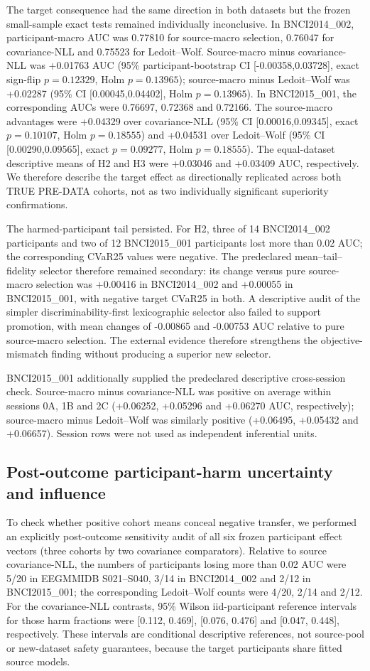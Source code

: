 The target consequence had the same direction in both datasets but the
frozen small-sample exact tests remained individually inconclusive. In
BNCI2014\_002, participant-macro AUC was 0.77810 for source-macro selection,
0.76047 for covariance-NLL and 0.75523 for Ledoit--Wolf.
Source-macro minus covariance-NLL was +0.01763 AUC
(95\% participant-bootstrap CI [-0.00358,0.03728], exact sign-flip
\(p=0.12329\), Holm \(p=0.13965\)); source-macro minus Ledoit--Wolf was
+0.02287 (95\% CI [0.00045,0.04402], Holm \(p=0.13965\)).
In BNCI2015\_001, the corresponding AUCs were 0.76697, 0.72368 and 0.72166.
The source-macro advantages were +0.04329 over covariance-NLL
(95\% CI [0.00016,0.09345], exact \(p=0.10107\), Holm
\(p=0.18555\)) and +0.04531 over Ledoit--Wolf
(95\% CI [0.00290,0.09565], exact \(p=0.09277\), Holm
\(p=0.18555\)). The equal-dataset descriptive means of H2 and H3 were
+0.03046 and +0.03409 AUC, respectively. We therefore describe the target
effect as directionally replicated across both TRUE PRE-DATA cohorts, not as
two individually significant superiority confirmations.

The harmed-participant tail persisted. For H2, three of 14 BNCI2014\_002
participants and two of 12 BNCI2015\_001 participants lost more than
0.02 AUC; the corresponding CVaR25 values were negative. The predeclared
mean--tail--fidelity selector therefore remained secondary: its change versus
pure source-macro selection was +0.00416 in BNCI2014\_002 and +0.00055 in
BNCI2015\_001, with negative target CVaR25 in both. A descriptive audit of
the simpler discriminability-first lexicographic selector also failed to
support promotion, with mean changes of -0.00865 and -0.00753 AUC relative
to pure source-macro selection. The external evidence therefore strengthens
the objective-mismatch finding without producing a superior new selector.

BNCI2015\_001 additionally supplied the predeclared descriptive
cross-session check. Source-macro minus covariance-NLL was positive on average
within sessions 0A, 1B and 2C (+0.06252, +0.05296 and +0.06270 AUC,
respectively); source-macro minus Ledoit--Wolf was similarly positive
(+0.06495, +0.05432 and +0.06657). Session rows were not used as independent
inferential units.

\subsection{Post-outcome participant-harm uncertainty and influence}
To check whether positive cohort means conceal negative transfer, we performed
an explicitly post-outcome sensitivity audit of all six frozen participant
effect vectors (three cohorts by two covariance comparators). Relative to
source covariance-NLL, the numbers of participants losing more than 0.02 AUC
were 5/20 in EEGMMIDB S021--S040, 3/14 in BNCI2014\_002 and 2/12 in
BNCI2015\_001; the corresponding Ledoit--Wolf counts were 4/20, 2/14 and
2/12. For the covariance-NLL contrasts, 95\% Wilson iid-participant
reference intervals for those harm fractions were [0.112, 0.469],
[0.076, 0.476] and [0.047, 0.448], respectively. These intervals are
conditional descriptive references, not source-pool or new-dataset safety
guarantees, because the target participants share fitted source models.

